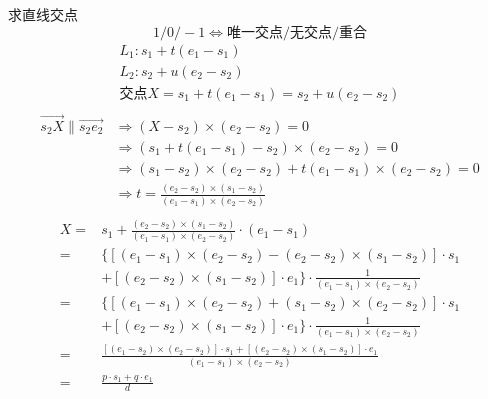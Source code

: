	\begin{lecture}{求直线交点}
		\[
		1/0/-1\Leftrightarrow \text{唯一交点/无交点/重合}
		\]
		\[
		\begin{array}{c}
		L_1 : s_1 + t(e_1 - s_1)\\
		L_2 : s_2 + u(e_2 - s_2)\\
		\text{交点} X = s_1 + t(e_1 - s_1) = s_2 + u(e_2 - s_2)\\
		\end{array}
		\]
		\[
		\begin{aligned}
		\overrightarrow{s_2X} \parallel \overrightarrow{s_2e_2} 
		& \Rightarrow (X - s_2) \times (e_2 - s_2) = 0\\
		& \Rightarrow (s_1 + t(e_1 - s_1) - s_2) \times (e_2 - s_2) = 0\\
		& \Rightarrow (s_1 - s_2) \times (e_2 - s_2) 
								+ t(e_1 - s_1) \times (e_2 - s_2) = 0\\
		& \Rightarrow t = \frac{(e_2 - s_2) \times (s_1 - s_2)}
													 {(e_1 - s_1) \times (e_2 - s_2)}\\
		\end{aligned}
		\]
		\[
		\begin{aligned}
		X = & s_1 
			+ \frac{(e_2 - s_2) \times (s_1 - s_2)}
						 {(e_1 - s_1) \times (e_2 - s_2)}
			\cdot (e_1 - s_1)\\
		= & \{[(e_1 - s_1) \times (e_2 - s_2) - (e_2 - s_2) \times (s_1 - s_2)] \cdot s_1 \\
			& + [(e_2 - s_2) \times (s_1 - s_2)] \cdot e_1 \}
			\cdot \frac{1}{(e_1 - s_1) \times (e_2 - s_2)}\\
		= & \{[(e_1 - s_1) \times (e_2 - s_2) + (s_1 - s_2) \times (e_2 - s_2)] \cdot s_1 \\
			& + [(e_2 - s_2) \times (s_1 - s_2)] \cdot e_1\} 
			\cdot \frac{1}{(e_1 - s_1) \times (e_2 - s_2)}\\
		= & \frac{
			[(e_1 - s_2) \times (e_2 - s_2)] \cdot s_1 
			+ [(e_2 - s_2) \times (s_1 - s_2)] \cdot e_1}
			{(e_1 - s_1) \times (e_2 - s_2)}\\
		= & \frac{p \cdot s_1 + q \cdot e_1}{d}
		\end{aligned}
		\]
	\end{lecture}

